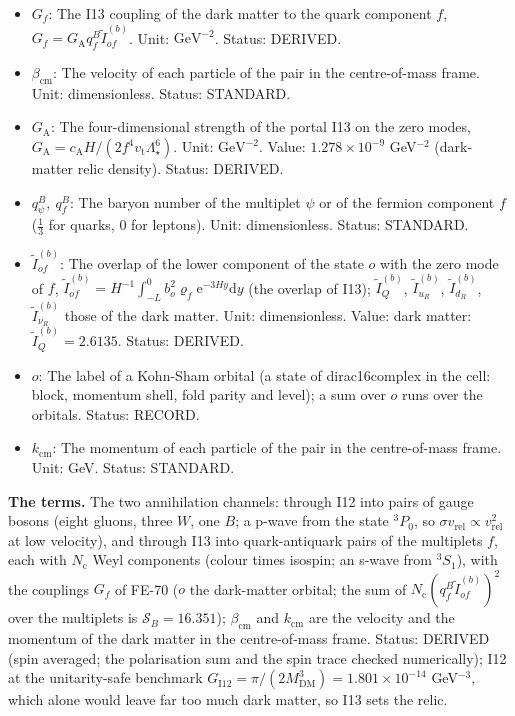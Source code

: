 \documentclass[
  10pt,
]{article}
\begin{document}
\begin{itemize}
  isospin): 6 for a quark doublet, 3 for a quark singlet, 2 for a lepton
  doublet, 1 for a charged-lepton singlet. Unit: dimensionless. Status:
  STANDARD.
\item
  \(G_f\): The I13 coupling of the dark matter to the quark component
  \(f\), \(G_f = G_{\mathrm{A}}q^B_f\tilde I^{(b)}_{of}\). Unit:
  \(\mathrm{GeV}^{-2}\). Status: DERIVED.
\item
  \(\beta_{\mathrm{cm}}\): The velocity of each particle of the pair in
  the centre-of-mass frame. Unit: dimensionless. Status: STANDARD.
\item
  \(G_{\mathrm{A}}\): The four-dimensional strength of the portal I13 on
  the zero modes,
  \(G_{\mathrm{A}} = c_{\mathrm{A}}H/(2f^4v_{\mathrm{t}}\Lambda_\star^6)\).
  Unit: \(\mathrm{GeV}^{-2}\). Value: \(1.278\times10^{-9}\)
  GeV\(^{-2}\) (dark-matter relic density). Status: DERIVED.
\item
  \(q^B_\psi,\ q^B_f\): The baryon number of the multiplet \(\psi\) or
  of the fermion component \(f\) (\(\frac13\) for quarks, 0 for
  leptons). Unit: dimensionless. Status: STANDARD.
\item
  \(\tilde I^{(b)}_{of}\): The overlap of the lower component of the
  state \(o\) with the zero mode of \(f\),
  \(\tilde I^{(b)}_{of} = H^{-1}\int_{-L}^{0}b_o^2\varrho_f\mathrm{e}^{-3Hy}\mathrm{d}y\)
  (the overlap of I13); \(\tilde I^{(b)}_Q\), \(\tilde I^{(b)}_{u_R}\),
  \(\tilde I^{(b)}_{d_R}\), \(\tilde I^{(b)}_{\nu_R}\) those of the dark
  matter. Unit: dimensionless. Value: dark matter:
  \(\tilde I^{(b)}_Q = 2.6135\). Status: DERIVED.
\item
  \(o\): The label of a Kohn-Sham orbital (a state of dirac16complex in
  the cell: block, momentum shell, fold parity and level); a sum over
  \(o\) runs over the orbitals. Status: RECORD.
\item
  \(k_{\mathrm{cm}}\): The momentum of each particle of the pair in the
  centre-of-mass frame. Unit: GeV. Status: STANDARD.
\end{itemize}

\textbf{The terms.} The two annihilation channels: through I12 into
pairs of gauge bosons (eight gluons, three \(W\), one \(B\); a p-wave
from the state \(^3P_0\), so
\(\sigma v_{\mathrm{rel}} \propto v_{\mathrm{rel}}^2\) at low velocity),
and through I13 into quark-antiquark pairs of the multiplets \(f\), each
with \(N_{\mathrm{c}}\) Weyl components (colour times isospin; an s-wave
from \(^3S_1\)), with the couplings \(G_f\) of FE-70 (\(o\) the
dark-matter orbital; the sum of
\(N_{\mathrm{c}}(q^B_f\tilde I^{(b)}_{of})^2\) over the multiplets is
\(\mathcal{S}_B = 16.351\)); \(\beta_{\mathrm{cm}}\) and
\(k_{\mathrm{cm}}\) are the velocity and the momentum of the dark matter
in the centre-of-mass frame. Status: DERIVED (spin averaged; the
polarisation sum and the spin trace checked numerically); I12 at the
unitarity-safe benchmark
\(G_{\mathrm{I12}} = \pi/(2M_{\mathrm{DM}}^3) = 1.801\times10^{-14}\)
GeV\(^{-3}\), which alone would leave far too much dark matter, so I13
sets the relic.
\end{document}
